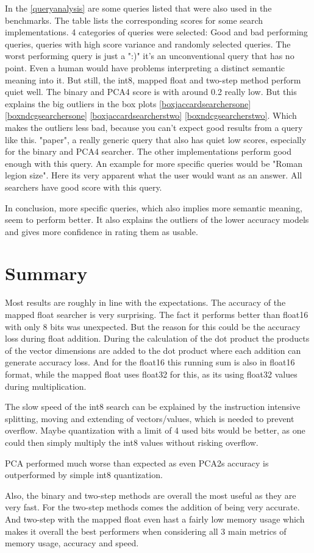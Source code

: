 In the \autoref{queryanalysis} are some queries listed that were also used in the benchmarks. The table lists the corresponding scores for some search implementations. 4 categories of queries were selected: Good and bad performing queries, queries with high score variance and randomly selected queries. The worst performing query is just a ":)" it's an unconventional query that has no point. Even a human would have problems interpreting a distinct semantic meaning into it. But still, the int8, mapped float and two-step method perform quiet well. The binary and PCA4 score is with around 0.2 really low. But this explains the big outliers in the box plots \ref{boxjaccardsearchersone} \ref{boxndcgsearchersone} \ref{boxjaccardsearcherstwo} \ref{boxndcgsearcherstwo}. Which makes the outliers less bad, because you can't expect good results from a query like this. "paper", a really generic query that also has quiet low scores, especially for the binary and PCA4 searcher. The other implementations perform good enough with this query. An example for more specific queries would be "Roman legion size". Here its very apparent what the user would want as an answer. All searchers have good score with this query.

In conclusion, more specific queries, which also implies more semantic meaning, seem to perform better. It also explains the outliers of the lower accuracy models and gives more confidence in rating them as usable.



\section{Summary}
Most results are roughly in line with the expectations. The accuracy of the mapped float searcher is very surprising. The fact it performs better than float16 with only 8 bits was unexpected. But the reason for this could be the accuracy loss during float addition. During the calculation of the dot product the products of the vector dimensions are added to the dot product where each addition can generate accuracy loss. And for the float16 this running sum is also in float16 format, while the mapped float uses float32 for this, as its using float32 values during multiplication.

The slow speed of the int8 search can be explained by the instruction intensive splitting, moving and extending of vectors/values, which is needed to prevent overflow. Maybe quantization with a limit of 4 used bits would be better, as one could then simply multiply the int8 values without risking overflow.

PCA performed much worse than expected as even PCA2s accuracy is outperformed by simple int8 quantization.

Also, the binary and two-step methods are overall the most useful as they are very fast. For the two-step methods comes the addition of being very accurate. And two-step with the mapped float even hast a fairly low memory usage which makes it overall the best performers when considering all 3 main metrics of memory usage, accuracy and speed.